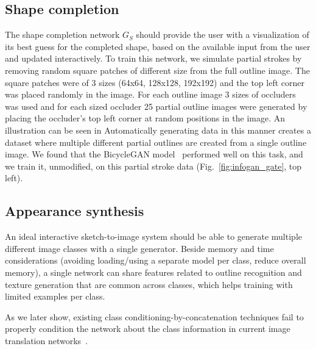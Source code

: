 \subsection{Shape completion}
\label{sec:shape}
The shape completion network $G_S$ should provide the user with a visualization of its best guess for the completed shape, based on the available input from the user and updated interactively. 
To train this network, we simulate partial strokes by removing random square patches of different size from the full outline image. 
The square patches were of 3 sizes (64x64, 128x128, 192x192) and the top left corner was placed randomly in the image. For each outline image 3 sizes of occluders was used and for each sized occluder 25 partial outline images were generated by placing the occluder's top left corner at random positions in the image. An illustration can be seen in 
Automatically generating data in this manner creates a dataset where multiple different partial outlines are created from a single outline image.
We found that the BicycleGAN model~\cite{zhu2017toward} performed well on this task, and we train it, unmodified, on this partial stroke data (Fig.~\ref{fig:infogan_gate}, top left).

\subsection{Appearance synthesis}
An ideal interactive sketch-to-image system  should be able to generate multiple different image classes with a single generator. 
Beside memory and time considerations (avoiding loading/using a separate model per class, reduce overall memory), a single network can share features related to outline recognition and texture generation that are common across classes, which helps training with limited examples per class. 

As we later show, existing class conditioning-by-concatenation techniques fail to properly condition the network about the class information in current image translation networks~\cite{isola2016image2image,zhu2017toward}.

